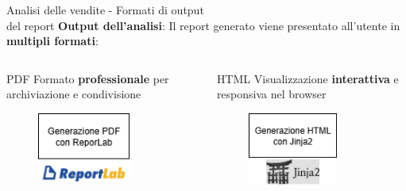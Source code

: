 \documentclass{beamer}
\begin{document}
	\begin{frame}{Analisi delle vendite - Formati di output\\ del report}
		\textbf{Output dell'analisi}: Il report generato viene presentato all'utente in \textbf{multipli formati}:

				\begin{columns}
					\begin{column}{0.33\textwidth}
						\begin{alertblock}{PDF}
							Formato \textbf{professionale} per archiviazione e condivisione
						\end{alertblock}
						\begin{figure}
							\centering
							\includegraphics[width=0.7\textwidth]{Diagramma generazione report PDF ReportLab.png}
						\end{figure}
					\end{column}
					\begin{column}{0.33\textwidth}
						\begin{exampleblock}{HTML}
							Visualizzazione \textbf{interattiva} e responsiva nel browser
						\end{exampleblock}
						\begin{figure}
							\centering
							\includegraphics[width=0.7\textwidth]{Diagramma generazione report HTML Jinja2.png}

\end{figure}
\end{column}
\end{columns}
\end{frame}
\end{document}

